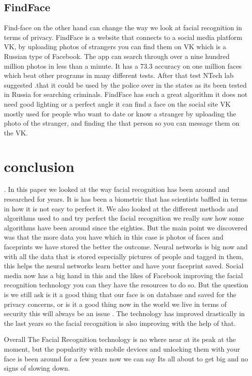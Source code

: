 \documentclass[journal]{IEEEtran}
\begin{document}
\subsection{FindFace}
Find-face on the other hand can change the way we look at facial recognition in terms of privacy. FindFace is a website that connects to a social media platform VK, by uploading photos of strangers you can find them on VK which is a Russian type of Facebook. The app can search through over a nine hundred million photos in less than a minute. It has a 73.3 accuracy on one million faces which beat other programs in many different tests. After that test NTech lab suggested .that it could be used by the police over in the states as its been tested in Russia for searching criminals. FindFace has such a great algorithm it does not need good lighting or a perfect angle it can find a face on the social site VK mostly used for people who want to date or know a stranger by uploading the photo of the stranger, and finding the that person so you can message them on the VK. 

\section{conclusion}.\newline
In this paper we looked at the way facial recognition has been around and researched for years. It is has been a biometric that has scientists baffled in terms in how it is not easy to perfect it. We also looked at the different methods and algorithms used to and try perfect the facial recognition we really saw how some algorithms have been around since the eighties. But the main point we discovered was that the more data you have which in this case is photos of faces and faceprints we have stored the better the outcome. Neural networks is big now and with all the data that is stored especially pictures of people and tagged in them, this helps the neural networks learn better and have your faceprint saved. Social media now has a big hand in this and the likes of Facebook improving the facial recognition technology you can they have the resources to do so. But the question is we still ask is it a good thing that our face is on database and saved for the privacy concerns, or is it a good thing now in the world we live in terms of security this will always be an issue . The technology has improved drastically in the last years so the facial recognition is also improving with the help of that.

Overall The Facial Recognition technology is no where near at its peak at the moment, but the popularity with mobile devices and unlocking them with your face is been around for a few years now we can say Its all about to get big and no signs of slowing down. 



\bigskip

\printbibliography
\end{document}
